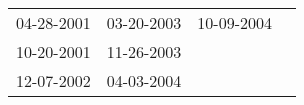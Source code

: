 \begin{supertabular}{llll}
 04-28-2001 &  03-20-2003 &  10-09-2004 \\
 10-20-2001 &  11-26-2003 &             \\
 12-07-2002 &  04-03-2004 &             \\
\end{supertabular}

